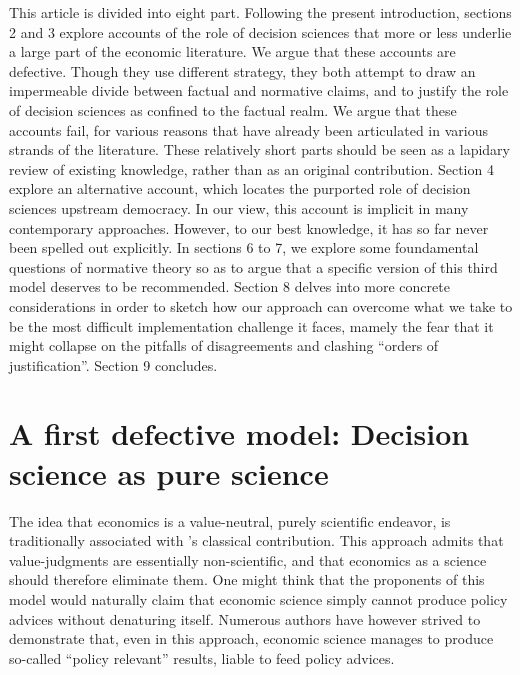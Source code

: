\documentclass[preprint,11pt]{elsarticle}
\begin{document}
This article is divided into eight part. Following the present introduction, sections 2 and 3 explore accounts of the role of decision sciences that more or less underlie a large part of the economic literature. We argue that these accounts are defective. Though they use different strategy, they both attempt to draw an impermeable divide between factual and normative claims, and to justify the role of decision sciences as confined to the factual realm. We argue that these accounts fail, for various reasons that have already been articulated in various strands of the literature. These relatively short parts should be seen as a lapidary review of existing knowledge, rather than as an original contribution. Section 4 explore an alternative account, which locates the purported role of decision sciences upstream democracy. In our view, this account is implicit in many contemporary approaches. However, to our best knowledge, it has so far never been spelled out explicitly. In sections 6 to 7, we explore some foundamental questions of normative theory so as to argue that a specific version of this third model deserves to be recommended. Section 8 delves into more concrete considerations in order to sketch how our approach can overcome what we take to be the most difficult implementation challenge it faces, mamely the fear that it might collapse on the pitfalls of disagreements and clashing ``orders of justification''. Section 9 concludes.

\section{A first defective model: Decision science as pure science}
\noindent The idea that economics is a value-neutral, purely scientific endeavor, is traditionally associated with \cite{robbins_essay_2007}'s classical contribution. This approach admits that value-judgments are essentially non-scientific, and that economics as a science should therefore eliminate them. One might think that the proponents of this model would naturally claim that economic science simply cannot produce policy advices without denaturing itself. Numerous authors have however strived to demonstrate that, even in this approach, economic science manages to produce so-called “policy relevant” results, liable to feed policy advices.
\end{document}
